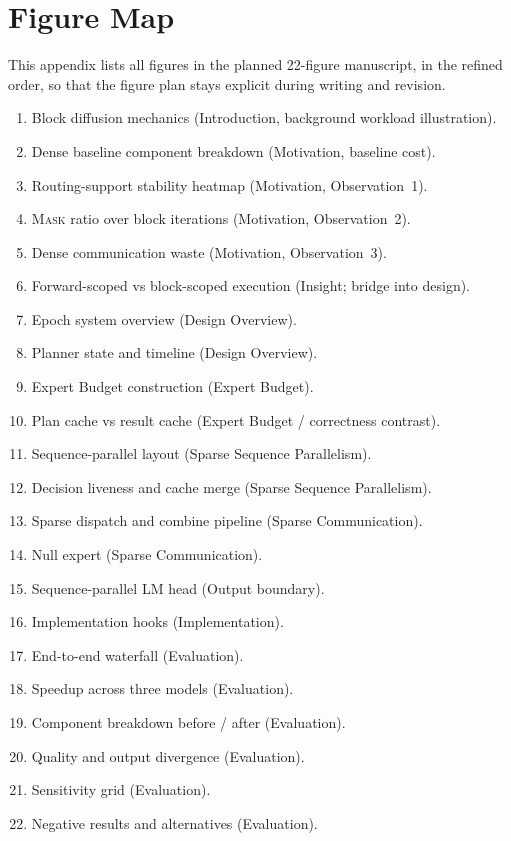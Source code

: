 \documentclass[sigconf,review,anonymous, 10pt]{acmart}
\newcommand{\sys}{Epoch}
\newcommand{\mask}{\textsc{Mask}}
\begin{document}
\appendix
\section{Figure Map}

This appendix lists all figures in the planned 22-figure manuscript, in the refined order, so that the figure plan stays explicit during writing and revision.

\begin{enumerate}[leftmargin=1.4em]
\item Block diffusion mechanics (Introduction, background workload illustration).
\item Dense baseline component breakdown (Motivation, baseline cost).
\item Routing-support stability heatmap (Motivation, Observation~1).
\item \mask{} ratio over block iterations (Motivation, Observation~2).
\item Dense communication waste (Motivation, Observation~3).
\item Forward-scoped vs block-scoped execution (Insight; bridge into design).
\item \sys{} system overview (Design Overview).
\item Planner state and timeline (Design Overview).
\item Expert Budget construction (Expert Budget).
\item Plan cache vs result cache (Expert Budget / correctness contrast).
\item Sequence-parallel layout (Sparse Sequence Parallelism).
\item Decision liveness and cache merge (Sparse Sequence Parallelism).
\item Sparse dispatch and combine pipeline (Sparse Communication).
\item Null expert (Sparse Communication).
\item Sequence-parallel LM head (Output boundary).
\item Implementation hooks (Implementation).
\item End-to-end waterfall (Evaluation).
\item Speedup across three models (Evaluation).
\item Component breakdown before / after (Evaluation).
\item Quality and output divergence (Evaluation).
\item Sensitivity grid (Evaluation).
\item Negative results and alternatives (Evaluation).
\end{enumerate}
\end{document}
